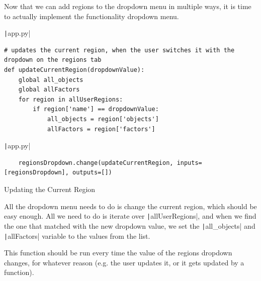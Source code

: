 \documentclass[12pt]{report}
\newcommand{\pil}[1]{\protect\texttt|#1|}
\begin{document}
Now that we can add regions to the dropdown menu in multiple ways, it is time to actually implement the functionality dropdown menu.

\begin{listing}[H]
\pil{app.py}
\begin{verbatim}
# updates the current region, when the user switches it with the dropdown on the regions tab
def updateCurrentRegion(dropdownValue):
    global all_objects
    global allFactors
    for region in allUserRegions:
        if region['name'] == dropdownValue:
            all_objects = region['objects']
            allFactors = region['factors']
\end{verbatim}
\pil{app.py}
\begin{verbatim}
    regionsDropdown.change(updateCurrentRegion, inputs=[regionsDropdown], outputs=[])
\end{verbatim}
\caption{Updating the Current Region}\label{cs:updateCurrentRegion}
\end{listing}

All the dropdown menu needs to do is change the current region, which should be easy enough. All we need to do is iterate over \pil{allUserRegions}, and when we find the one that matched with the new dropdown value, we set the \pil{all_objects} and \pil{allFactors} variable to the values from the list.

This function should be run every time the value of the regions dropdown changes, for whatever reason (e.g. the user updates it, or it gets updated by a function).

\begin{center}
\end{center}
\end{document}

